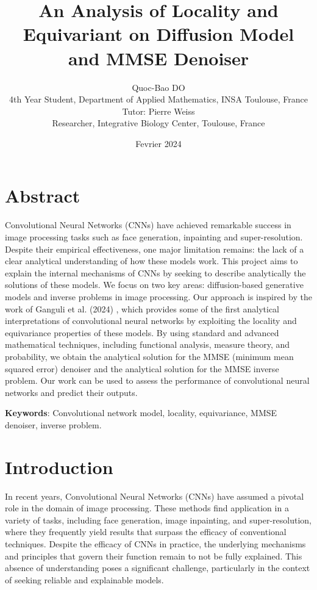 \documentclass[a4paper,10pt]{article}
\title{An Analysis of Locality and Equivariant on Diffusion Model and MMSE Denoiser}
\author{Quoc-Bao DO \\
4th Year Student, Department of Applied Mathematics, INSA Toulouse, France \\
Tutor: Pierre Weiss \\
Researcher, Integrative Biology Center, Toulouse, France}
\date{Fevrier 2024}
\theoremstyle{definition} %
\theoremstyle{definition} %
\theoremstyle{definition} %
\theoremstyle{definition} %
\newcommand{\0}{\boldsymbol{0}}
\begin{document}
\maketitle


\tableofcontents

\newpage
\section*{Abstract}
Convolutional Neural Networks (CNNs) have achieved remarkable success in image processing tasks such as face generation, inpainting and super-resolution. Despite their empirical effectiveness, one major limitation remains: the lack of a clear analytical understanding of how these models work. This project aims to explain the internal mechanisms of CNNs by seeking to describe analytically the solutions of these models. We focus on two key areas: diffusion-based generative models and inverse problems in image processing. Our approach is inspired by the work of Ganguli et al. (2024) \cite{kamb2024analytictheorycreativityconvolutional}, which provides some of the first analytical interpretations of convolutional neural networks by exploiting the locality and equivariance properties of these models. By using standard and advanced mathematical techniques, including functional analysis, measure theory, and probability, we obtain the analytical solution for the MMSE (minimum mean squared error) denoiser and the analytical solution for the MMSE inverse problem. Our work can be used to assess the performance of convolutional neural networks and predict their outputs.

\textbf{Keywords}: Convolutional network model, locality, equivariance, MMSE denoiser, inverse problem.

\section{Introduction}

In recent years, Convolutional Neural Networks (CNNs) have assumed a pivotal role in the domain of image processing. These methods find application in a variety of tasks, including face generation, image inpainting, and super-resolution, where they frequently yield results that surpass the efficacy of conventional techniques. Despite the efficacy of CNNs in practice, the underlying mechanisms and principles that govern their function remain to not be fully explained. This absence of understanding poses a significant challenge, particularly in the context of seeking reliable and explainable models.
\end{document}
